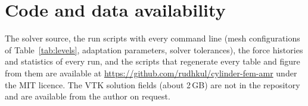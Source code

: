 \documentclass[preprint,12pt,number]{elsarticle}
\begin{document}
\section*{Code and data availability}
The solver source, the run scripts with every command line (mesh configurations of
Table~\ref{tab:levels}, adaptation parameters, solver tolerances), the force histories and
statistics of every run, and the scripts that regenerate every table and figure from them are
available at \url{https://github.com/rudhkul/cylinder-fem-amr} under the MIT licence. The VTK
solution fields (about 2\,GB) are not in the repository and are available from the author on
request.



\end{document}
